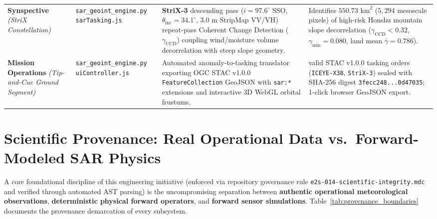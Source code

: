 \documentclass[10pt,twocolumn,letterpaper]{article}
\begin{document}
\begin{table}[t]
\begin{tabularx}{\textwidth}{>{\raggedright\arraybackslash}p{2.8cm} >{\raggedright\arraybackslash}p{3.5cm} >{\raggedright\arraybackslash}p{5.1cm} >{\raggedright\arraybackslash}X}
\addlinespace[0.12cm]
\textbf{Synspective} \newline \textit{(StriX Constellation)} & \texttt{sar\_geoint\_engine.py} \newline \texttt{sarTasking.js} & \textbf{StriX-3} descending pass ($i = 97.6^\circ$ SSO, $\theta_{\text{inc}} = 34.1^\circ$, $3.0\text{ m}$ StripMap VV/VH) repeat-pass Coherent Change Detection ($\gamma_{\text{CCD}}$) coupling wind/moisture volume decorrelation with steep slope geometry. & Identifies \textbf{$550.73\text{ km}^2$} ($5,294$ mesoscale pixels) of high-risk Honshu mountain slope decorrelation ($\gamma_{\text{CCD}} < 0.32$, $\gamma_{\text{min}} = 0.080$, land mean $\bar{\gamma} = 0.786$). \\
\addlinespace[0.12cm]
\textbf{Mission Operations} \newline \textit{(Tip-and-Cue Ground Segment)} & \texttt{sar\_geoint\_engine.py} \newline \texttt{uiController.js} & Automated anomaly-to-tasking translator exporting OGC STAC v1.0.0 \texttt{FeatureCollection} GeoJSON with \texttt{sar:*} extensions and interactive 3D WebGL orbital frustums. & 2 valid STAC v1.0.0 tasking orders (\texttt{ICEYE-X38}, \texttt{StriX-3}) sealed with SHA-256 digest \texttt{3fecc248...0d47035}; 1-click browser GeoJSON export. \\
\bottomrule
\end{tabularx}
\end{table}

\section{Scientific Provenance: Real Operational Data vs.\ Forward-Modeled SAR Physics}

A core foundational discipline of this engineering initiative (enforced via repository governance rule \texttt{e2s-014-scientific-integrity.mdc} and verified through automated AST parsing) is the uncompromising separation between \textbf{authentic operational meteorological observations}, \textbf{deterministic physical forward operators}, and \textbf{forward sensor simulations}. Table~\ref{tab:provenance_boundaries} documents the provenance demarcation of every subsystem.
\end{document}
